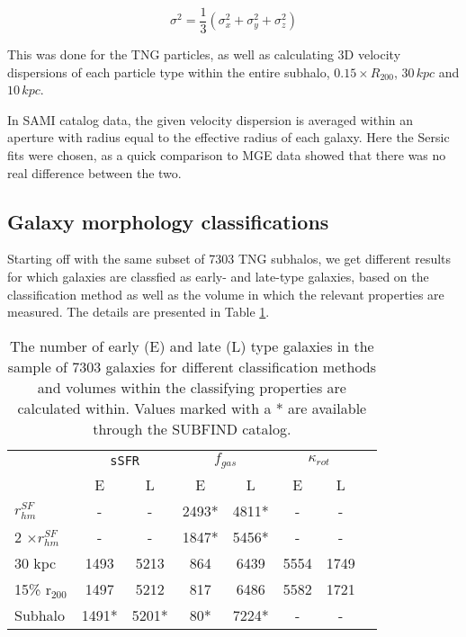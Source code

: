 \begin{equation} \label{sigma1}
    \sigma^{2} = \frac{1}{3}(\sigma_x^2 + \sigma_y^2 + \sigma_z^2)
\end{equation}

This was done for the TNG particles, as well as calculating 3D velocity dispersions of each particle type within the entire subhalo, $0.15 \times R_{200}$, $30\,kpc$ and $10\,kpc$.

In SAMI catalog data, the given velocity dispersion is averaged within an aperture with radius equal to the effective radius of each galaxy. Here the Sersic fits were chosen, as a quick comparison to MGE data showed that there was no real difference between the two.

\subsection{Galaxy morphology classifications}

Starting off with the same subset of 7303 TNG subhalos, we get different results for which galaxies are classfied as early- and late-type galaxies, based on the classification method as well as the volume in which the relevant properties are measured. The details are presented in Table \ref{morph}.

\begin{table}
\begin{center}
\caption{The number of early (E) and late (L) type galaxies in the sample of 7303 galaxies for different classification methods and volumes within the classifying properties are calculated within. Values marked with a * are available through the SUBFIND catalog.}
 \label{morph}
\begin{tabular}{ l| c c c c c c c } 
 \hline
 \hline
   &\multicolumn{2}{c}{\texttt{sSFR}}&\multicolumn{2}{c}{$f_{gas}$}&\multicolumn{2}{c}{$\kappa_{rot}$}\\
   &  E & L & E & L & E & L \\
 \hline
 $r_{hm}^{SF}$ & - & - & 2493* & 4811* & - & - \\ 
 2 $\times r_{hm}^{SF}$ & - & - & 1847* & 5456* & - & - \\ 
 30 kpc & 1493 & 5213 & 864 & 6439 & 5554 & 1749 \\ 
 15\% r$_{200}$ & 1497 & 5212 & 817 & 6486 & 5582 & 1721 \\ 
 Subhalo & 1491* & 5201* & 80* & 7224* & - & - \\ 
 \hline 
 \end{tabular}
\end{center}
\end{table}

